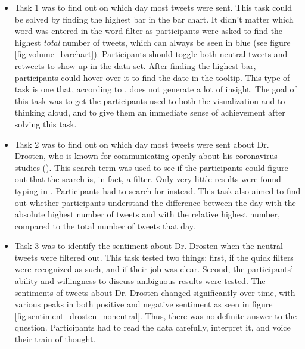 \begin{itemize}
    \item Task 1 was to find out on which day most tweets were sent. This task could be solved by finding the highest bar in the bar chart. It didn't matter which word was entered in the word filter as participants were asked to find the highest \emph{total} number of tweets, which can always be seen in blue (see figure \ref{fig:volume_barchart}). Participants should toggle both neutral tweets and retweets to show up in the data set. After finding the highest bar, participants could hover over it to find the date in the tooltip. This type of task is one that, according to \citeauthor{northMeasuringVisualizationInsight2006}, does not generate a lot of insight. The goal of this task was to get the participants used to both the visualization and to thinking aloud, and to give them an immediate sense of achievement after solving this task.
    \item Task 2 was to find out on which day most tweets were sent about Dr. Drosten, who is known for communicating openly about his coronavirus studies (\cite{henleyCoronavirusMeetScientists2020}). This search term was used to see if the participants could figure out that the search is, in fact, a filter. Only very little results were found typing in . Participants had to search for  instead. This task also aimed to find out whether participants understand the difference between the day with the absolute highest number of tweets and with the relative highest number, compared to the total number of tweets that day.
    \item Task 3 was to identify the sentiment about Dr. Drosten when the neutral tweets were filtered out. This task tested two things: first, if the quick filters were recognized as such, and if their job was clear. Second, the participants' ability and willingness to discuss ambiguous results were tested. The sentiments of tweets about Dr. Drosten changed significantly over time, with various peaks in both positive and negative sentiment as seen in figure \ref{fig:sentiment_drosten_noneutral}. Thus, there was no definite answer to the question. Participants had to read the data carefully, interpret it, and voice their train of thought.
    \begin{figure}[htb]

\end{figure}
\end{itemize}
